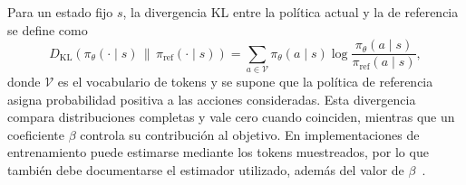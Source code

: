 Para un estado fijo $s$, la divergencia KL entre la política actual y la de referencia se define como
\begin{equation}
D_{\mathrm{KL}}\!\left(\pi_\theta(\cdot\mid s)\,\|\,\pi_{\mathrm{ref}}(\cdot\mid s)\right)
=\sum_{a\in\mathcal{V}}\pi_\theta(a\mid s)
\log\frac{\pi_\theta(a\mid s)}{\pi_{\mathrm{ref}}(a\mid s)},
\label{eq:kl}
\end{equation}
donde $\mathcal{V}$ es el vocabulario de tokens y se supone que la política de referencia asigna probabilidad positiva a las acciones consideradas. Esta divergencia compara distribuciones completas y vale cero cuando coinciden, mientras que un coeficiente $\beta$ controla su contribución al objetivo. En implementaciones de entrenamiento puede estimarse mediante los tokens muestreados, por lo que también debe documentarse el estimador utilizado, además del valor de $\beta$~\cite{shao2024deepseekmath}.


